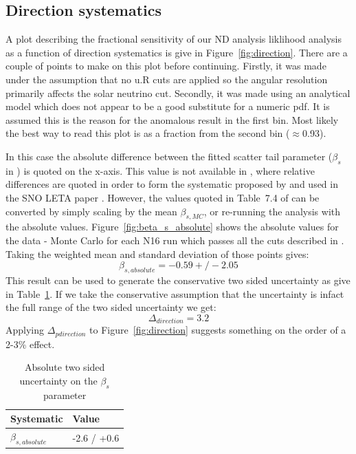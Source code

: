 \documentclass[]{article}
\begin{document}
\subsection{Direction systematics}
A plot describing the fractional sensitivity of our ND analysis liklihood analysis as a function of direction systematics is give in Figure~\ref{fig:direction}. There are a couple of points to make on this plot before continuing. Firstly, it was made under the assumption that no u.R cuts are applied so the angular resolution primarily affects the solar neutrino cut. Secondly, it was made using an analytical model which does not appear to be a good substitute for a numeric pdf. It is assumed this is the reason for the anomalous result in the first bin. Most likely the best way to read this plot is as a fraction from the second bin ($\approx$0.93).

In this case the absolute difference between the fitted scatter tail parameter ($\beta_s$ in \cite{WaterUniDoc}) is quoted on the x-axis. This value is not available in \cite{WaterUniDoc}, where relative differences are quoted in order to form the systematic proposed by \cite{Oser} and used in the SNO LETA paper \cite{LETApaper}. However, the values quoted in Table~7.4 of \cite{WaterUniDoc} can be converted by simply scaling by the mean $\beta_{s,MC}$, or re-running the analysis with the absolute values. Figure~\ref{fig:beta_s_absolute} shows the absolute values for the data - Monte Carlo for each N16 run which passes all the cuts described in \cite{WaterUniDoc}. Taking the weighted mean and standard deviation of those points gives:
\begin{equation}
\beta_{s, absolute} = -0.59 +/- 2.05
\end{equation}
This result can be used to generate the conservative two sided uncertainty as give in Table~\ref{tab:direction}. If we take the conservative assumption that the uncertainty is infact the full range of the two sided uncertainty we get:
\begin{equation}
\Delta_{direction} = 3.2
\end{equation}
Applying $\Delta_{pdirection}$ to Figure~\ref{fig:direction} suggests something on the order of a 2-3\% effect. 

\begin{table}
	\label{tab:direction}
	\centering
	\begin{tabular}{p{2.5cm}|p{3.5cm}}
		\hline
		Systematic &  Value\\
		\hline
		\hline
		$\beta_{s, absolute}$ & -2.6 / +0.6 \\
		\hline
	\end{tabular}
	\caption{Absolute two sided uncertainty on the $\beta_s$ parameter}
\end{table}
\end{document}
